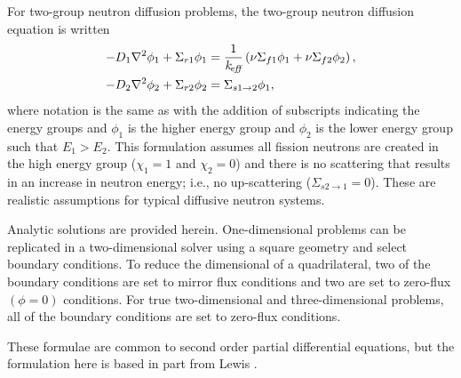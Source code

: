   For two-group neutron diffusion problems, the two-group neutron diffusion 
  equation is written 
  \begin{align} 
    \label{eq:twogroup1}
    -D_1 \mathbf{\nabla}^2 \phi_1 + \Sigma_{r1} \phi_1 &= \frac{1}{k_{\!\mbox{\scriptsize \em eff}}} \left(
      \nu \Sigma_{f1} \phi_1 + \nu \Sigma_{f2} \phi_2 \right), \\
    \label{eq:twogroup2}
    -D_2 \mathbf{\nabla}^2 \phi_2 + \Sigma_{r2} \phi_2 &= 
      \Sigma_{s 1 \rightarrow 2} \phi_1,
  \end{align}
  where notation is the same as  with the addition of
  subscripts indicating the energy groups and $\phi_1$ is the higher energy 
  group and $\phi_2$ is the lower energy group such that $E_1 > E_2$. This 
  formulation assumes all fission neutrons are created in the high energy group 
  ($\chi_1 = 1$ and $\chi_2 = 0$) and there is no scattering that results in an 
  increase in neutron energy; i.e., no up-scattering 
  ($\Sigma_{s 2 \rightarrow 1} = 0$). These are realistic assumptions for 
  typical diffusive neutron systems.

  Analytic solutions are provided herein. One-dimensional problems can be 
  replicated in a two-dimensional solver using a square geometry and select 
  boundary conditions. To reduce the dimensional of a quadrilateral, two of the 
  boundary conditions are set to mirror flux conditions and two are set to 
  zero-flux $(\phi = 0)$ conditions. For true two-dimensional and three-dimensional 
  problems, all of the boundary conditions are set to zero-flux conditions.
  
  These formulae are common to second order partial differential equations, but
  the formulation here is based in part from Lewis \cite{textbooklewis}.

